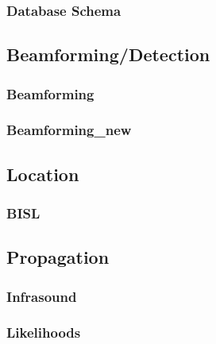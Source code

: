 \documentclass[letterpaper,10pt,english]{sphinxmanual}
\begin{document}
\subsubsection{Database Schema}
\label{\detokenize{infrapy.database:database-schema}}

\subsection{Beamforming/Detection}
\label{\detokenize{infrapy.detection:beamforming-detection}}\label{\detokenize{infrapy.detection::doc}}

\subsubsection{Beamforming}
\label{\detokenize{infrapy.detection:beamforming}}

\subsubsection{Beamforming\_new}
\label{\detokenize{infrapy.detection:beamforming-new}}

\subsection{Location}
\label{\detokenize{infrapy.location:location}}\label{\detokenize{infrapy.location::doc}}

\subsubsection{BISL}
\label{\detokenize{infrapy.location:bisl}}

\subsection{Propagation}
\label{\detokenize{infrapy.propagation:propagation}}\label{\detokenize{infrapy.propagation::doc}}

\subsubsection{Infrasound}
\label{\detokenize{infrapy.propagation:infrasound}}

\subsubsection{Likelihoods}
\label{\detokenize{infrapy.propagation:likelihoods}}
\end{document}
